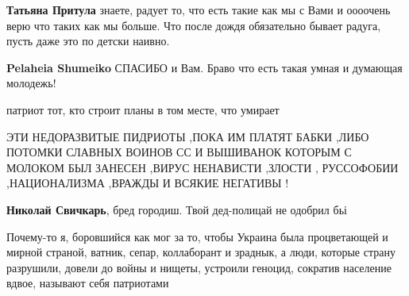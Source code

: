 \begin{itemize}
\begin{itemize} %
\textbf{Татьяна Притула} знаете, радует то, что есть такие как мы с Вами и оооочень верю что таких как мы больше.
Что после дождя обязательно бывает радуга, пусть даже это по детски наивно.

\textbf{Pelaheia Shumeiko} СПАСИБО и Вам.
Браво что есть такая умная и думающая молодежь!
\end{itemize} %

патриот тот, кто строит планы в том месте, что умирает


ЭТИ НЕДОРАЗВИТЫЕ ПИДРИОТЫ ,ПОКА ИМ ПЛАТЯТ БАБКИ ,ЛИБО ПОТОМКИ СЛАВНЫХ ВОИНОВ СС
И ВЫШИВАНОК КОТОРЫМ С МОЛОКОМ БЫЛ ЗАНЕСЕН ,ВИРУС НЕНАВИСТИ ,ЗЛОСТИ , РУССОФОБИИ
,НАЦИОНАЛИЗМА ,ВРАЖДЫ И ВСЯКИЕ НЕГАТИВЫ !

\begin{itemize} %
\textbf{Николай Свичкарь}, бред городиш. Твой дед-полицай не одобрил бьі
\end{itemize} %


Почему-то я, боровшийся как мог за то, чтобы Украина была процветающей и мирной
страной, ватник, сепар, коллаборант и зраднык, а люди, которые страну
разрушили, довели до войны и нищеты, устроили геноцид, сократив население
вдвое, называют себя патриотами

\end{itemize} %
